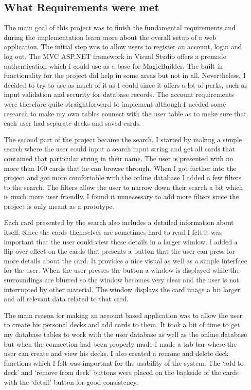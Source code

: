 \documentclass[paper=a4, fontsize=11pt]{scrartcl} %
\numberwithin{equation}{section} %
\numberwithin{figure}{section} %
\numberwithin{table}{section} %
\begin{document}
\subsection{What Requirements were met}
The main goal of this project was to finish the fundamental requirements and during the implementation learn more about the overall setup of a web application. The initial step was to allow users to register an account, login and log out. The MVC ASP.NET framework in Visual Studio offers a premade authentication which I could use as a base for MagicBuilder. The built in functionality for the project did help in some areas but not in all. Nevertheless, I decided to try to use as much of it as I could since it offers a lot of perks, such as input validation and security for database records. The account requirements were therefore quite straightforward to implement although I needed some research to make my own tables connect with the user table as to make sure that each user had separate decks and saved cards.
  
The second part of the project became the search. I started by making a simple search where the user could input a search input string and get all cards that contained that particular string in their name. The user is presented with no more than 100 cards that he can browse through. When I got further into the project and got more comfortable with the online database I added a few filters to the search. The filters allow the user to narrow down their search a bit which is much more user friendly. I found it unnecessary to add more filters since the project is only meant as a prototype.

Each card presented by the search also includes a detailed information about itself. Since the cards themselves are sometimes hard to read I felt it was important that the user could view these details in a larger window. I added a flip over effect on the cards that presents a button that the user can press for more details about the card. It provides a nice visual as well as a simple interface for the user. When the user presses the button a window is displayed while the surroundings are blurred so the window becomes very clear and the user is not interrupted by other material. The window displays the card image a bit larger and all relevant data related to that card.

The main reason for making an account based application was to allow the user to create his personal decks and add cards to them. It took a bit of time to get my database tables to work with the user database as well as the online database but when the connection had been properly made I made a tab bar where the user can create and view his decks. I also created a rename and delete deck functions which I felt was important for the usability of the system. The ‘add to deck’ and ‘remove from deck’ buttons were placed on the backside of the cards with the ‘detail’ button for good consistency.
\end{document}

